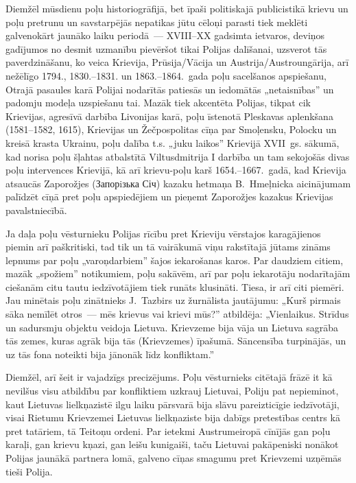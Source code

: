 \documentclass[twoside,a5paper,12pt,fleqn,openany]{extbook}
\newcommand{\uktxti}[1]{\textukrainian{#1}}
\begin{document}
Diemžēl mūsdienu poļu historiogrāfijā, bet īpaši politiskajā publicistikā krievu un poļu pretrunu un savstarpējās nepatikas jūtu cēloņi parasti tiek meklēti galvenokārt jaunāko laiku periodā~--- XVIII--XX gadsimta ietvaros, deviņos gadījumos no desmit uzmanību pievēršot tikai Polijas dalīšanai, uzsverot tās paverdzināšanu, ko veica Krievija, Prūsija/Vācija un Austrija/Austroungārija, arī nežēlīgo 1794., 1830.--1831. un 1863.--1864.~gada poļu sacelšanos apspiešanu, Otrajā pasaules karā Polijai nodarītās patiesās un iedomātās „netaisnības” un padomju modeļa uzspiešanu tai. Mazāk tiek akcentēta Polijas, tikpat cik Krievijas, agresīvā darbība Livonijas karā, poļu īstenotā Pleskavas aplenkšana (1581--1582, 1615), Krievijas un Žečpospolitas cīņa par Smoļensku, Polocku un kreisā krasta Ukrainu, poļu dalība t.s. „juku laikos” Krievijā XVII~gs. sākumā, kad norisa poļu šļahtas atbalstītā Viltusdmitrija I darbība un tam sekojošās divas poļu intervences Krievijā, kā arī krievu-poļu karš 1654.--1667.~gadā, kad Krievija atsaucās Zaporožjes (\uktxti{Запорiзька Січ}) kazaku hetmaņa B.~Hmeļnicka aicinājumam palīdzēt cīņā pret poļu apspiedējiem un pieņemt Zaporožjes kazakus Krievijas pavalstniecībā.

Ja daļa poļu vēsturnieku Polijas rīcību pret Krieviju vērstajos karagājienos piemin arī paškritiski, tad tik un tā vairākumā viņu rakstītajā jūtams zināms lepnums par poļu „varoņdarbiem” šajos iekarošanas karos. Par daudziem citiem, mazāk „spožiem” notikumiem, poļu sakāvēm, arī par poļu iekarotāju nodarītajām ciešanām citu tautu iedzīvotājiem tiek runāts klusināti. Tiesa, ir arī citi piemēri. Jau minētais poļu zinātnieks J.~Tazbirs uz žurnālista jautājumu: „Kurš pirmais sāka nemīlēt otros~--- mēs krievus vai krievi mūs?” atbildēja: „Vienlaikus. Strīdus un sadursmju objektu veidoja Lietuva. Krievzeme bija vāja un Lietuva sagrāba tās zemes, kuras agrāk bija tās (Krievzemes) īpašumā. Sāncensība turpinājās, un uz tās fona noteikti bija jānonāk līdz konfliktam.”

Diemžēl, arī šeit ir vajadzīgs precizējums. Poļu vēsturnieks citētajā frāzē it kā nevilšus visu atbildību par konfliktiem uzkrauj Lietuvai, Poliju pat nepieminot, kaut Lietuvas lielkņazistē ilgu laiku pārsvarā bija slāvu pareizticīgie iedzīvotāji, visai Rietumu Krievzemei Lietuvas lielkņaziste bija dabīgs pretestības centrs kā pret tatāriem, tā Teitoņu ordeni. Par ietekmi Austrumeiropā cīnījās gan poļu karaļi, gan krievu kņazi, gan leišu kunigaiši, taču Lietuvai pakāpeniski nonākot Polijas jaunākā partnera lomā, galveno cīņas smagumu pret Krievzemi uzņēmās tieši Polija.
\end{document}
